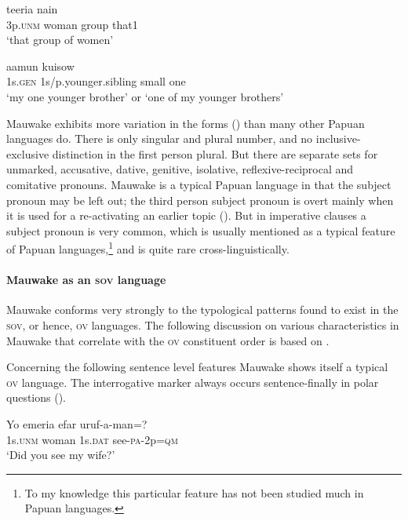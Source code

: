 \ea%
\label{ex:x658}
\gll {}   teeria  nain \\
 3p.\textsc{unm}  woman  group  that1     \\
\glt `that group of women'
\z


\ea%
\label{ex:x660}
\gll {}  aamun    kuisow \\
 1s.\textsc{gen}  1s/p.younger.sibling  small  one     \\
\glt`my one younger brother' or `one of my younger brothers'
\z


Mauwake exhibits more variation in the  forms () than many other Papuan languages do.  There is only singular and plural number, and no inclusive-exclusive distinction in the first person plural.  But there are separate sets for unmarked, accusative, dative, genitive, isolative, reflexive-reciprocal and comitative pronouns.  Mauwake is a typical Papuan language in that the subject pronoun may be left out; the third person subject pronoun is overt  mainly when it is used for a re-activating an earlier topic ().  But in imperative clauses a subject pronoun is very common, which is  usually mentioned as a typical feature of Papuan languages,\footnote{To my knowledge this particular feature has not been studied much in Papuan languages.}  and is quite rare cross-linguistically.

\paragraph[Mauwake as an \textsc{sov} language]{Mauwake as an \textsc{sov} language}
Mauwake conforms very strongly to the typological patterns found to exist in the \textsc{sov}, or hence, \textsc{ov} languages.  The following discussion on various characteristics in Mauwake that correlate with the \textsc{ov} constituent order is based on \citet{Dryer2007a}.

Concerning the following sentence level features Mauwake shows itself a typical \textsc{ov} language.  The interrogative marker \emphs{-}  always occurs sentence-finally in polar questions ().

\ea%
\label{ex:x672}
\gll Yo  emeria  efar  uruf-a-man=? \\
1s.\textsc{unm} woman  1s.\textsc{dat}  see-\textsc{pa}-2p=\textsc{qm}     \\
\glt`Did you see my wife?'
\z


